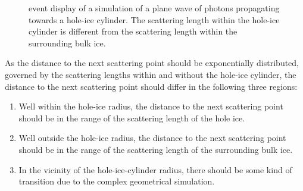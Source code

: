 \begin{figure}[htbp]
  \caption{\steamshovel event display of a simulation of a plane wave of photons propagating towards a hole-ice cylinder. The scattering length within the hole-ice cylinder is different from the scattering length within the surrounding bulk ice.}
  \label{fig:An7ik8pu}
\end{figure}

As the distance to the next scattering point should be exponentially distributed, governed by the scattering lengths within and without the hole-ice cylinder, the distance to the next scattering point should differ in the following three regions:

\begin{enumerate}
  \item Well within the hole-ice radius, the distance to the next scattering point should be in the range of the scattering length of the hole ice.
  \item Well outside the hole-ice radius, the distance to the next scattering point should be in the range of the scattering length of the surrounding bulk ice.
  \item In the vicinity of the hole-ice-cylinder radius, there should be some kind of transition due to the complex geometrical simulation.
\end{enumerate}

